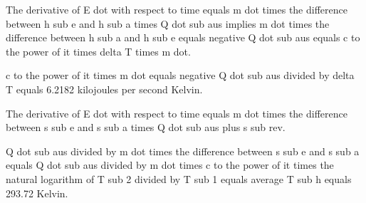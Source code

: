 The derivative of E dot with respect to time equals m dot times the difference between h sub e and h sub a times Q dot sub aus implies m dot times the difference between h sub a and h sub e equals negative Q dot sub aus equals c to the power of it times delta T times m dot.

c to the power of it times m dot equals negative Q dot sub aus divided by delta T equals 6.2182 kilojoules per second Kelvin.

The derivative of E dot with respect to time equals m dot times the difference between s sub e and s sub a times Q dot sub aus plus s sub rev.

Q dot sub aus divided by m dot times the difference between s sub e and s sub a equals Q dot sub aus divided by m dot times c to the power of it times the natural logarithm of T sub 2 divided by T sub 1 equals average T sub h equals 293.72 Kelvin.